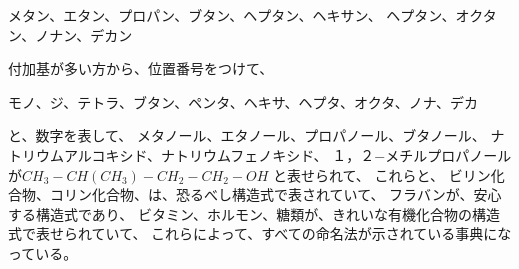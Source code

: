 \documentclass{jsarticle}
\begin{document}
\title{}
\author{}
\date{}
\maketitle

メタン、エタン、プロパン、ブタン、ヘプタン、ヘキサン、
ヘプタン、オクタン、ノナン、デカン

付加基が多い方から、位置番号をつけて、

モノ、ジ、テトラ、ブタン、ペンタ、ヘキサ、ヘプタ、オクタ、ノナ、デカ

と、数字を表して、
メタノール、エタノール、プロパノール、ブタノール、
ナトリウムアルコキシド、ナトリウムフェノキシド、
１，２−メチルプロパノールが$CH_3-CH(CH_3)-CH_2-CH_2-OH$
と表せられて、
これらと、
ビリン化合物、コリン化合物、は、恐るべし構造式で表されていて、
フラバンが、安心する構造式であり、
ビタミン、ホルモン、糖類が、きれいな有機化合物の構造式で表せられていて、
これらによって、すべての命名法が示されている事典になっている。
\end{document}
